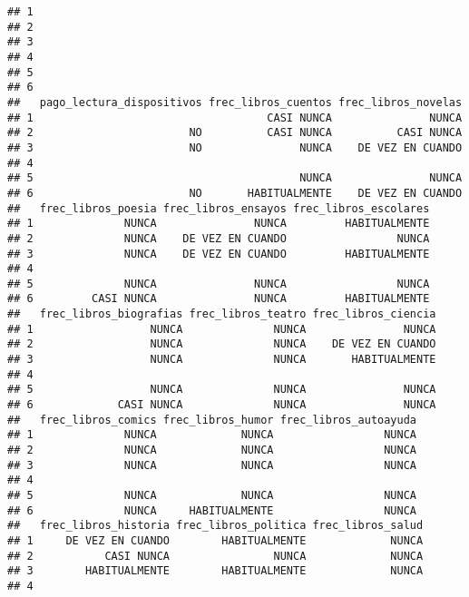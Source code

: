 \documentclass[
]{article}
\begin{document}
\begin{verbatim}
## 1                                                                        
## 2                                                                        
## 3                                                                        
## 4                                                                        
## 5                                                                        
## 6                                                                        
##   pago_lectura_dispositivos frec_libros_cuentos frec_libros_novelas
## 1                                    CASI NUNCA               NUNCA
## 2                        NO          CASI NUNCA          CASI NUNCA
## 3                        NO               NUNCA    DE VEZ EN CUANDO
## 4                                                                  
## 5                                         NUNCA               NUNCA
## 6                        NO       HABITUALMENTE    DE VEZ EN CUANDO
##   frec_libros_poesia frec_libros_ensayos frec_libros_escolares
## 1              NUNCA               NUNCA         HABITUALMENTE
## 2              NUNCA    DE VEZ EN CUANDO                 NUNCA
## 3              NUNCA    DE VEZ EN CUANDO         HABITUALMENTE
## 4                                                             
## 5              NUNCA               NUNCA                 NUNCA
## 6         CASI NUNCA               NUNCA         HABITUALMENTE
##   frec_libros_biografias frec_libros_teatro frec_libros_ciencia
## 1                  NUNCA              NUNCA               NUNCA
## 2                  NUNCA              NUNCA    DE VEZ EN CUANDO
## 3                  NUNCA              NUNCA       HABITUALMENTE
## 4                                                              
## 5                  NUNCA              NUNCA               NUNCA
## 6             CASI NUNCA              NUNCA               NUNCA
##   frec_libros_comics frec_libros_humor frec_libros_autoayuda
## 1              NUNCA             NUNCA                 NUNCA
## 2              NUNCA             NUNCA                 NUNCA
## 3              NUNCA             NUNCA                 NUNCA
## 4                                                           
## 5              NUNCA             NUNCA                 NUNCA
## 6              NUNCA     HABITUALMENTE                 NUNCA
##   frec_libros_historia frec_libros_politica frec_libros_salud
## 1     DE VEZ EN CUANDO        HABITUALMENTE             NUNCA
## 2           CASI NUNCA                NUNCA             NUNCA
## 3        HABITUALMENTE        HABITUALMENTE             NUNCA
## 4                                                            

\end{verbatim}
\end{document}
